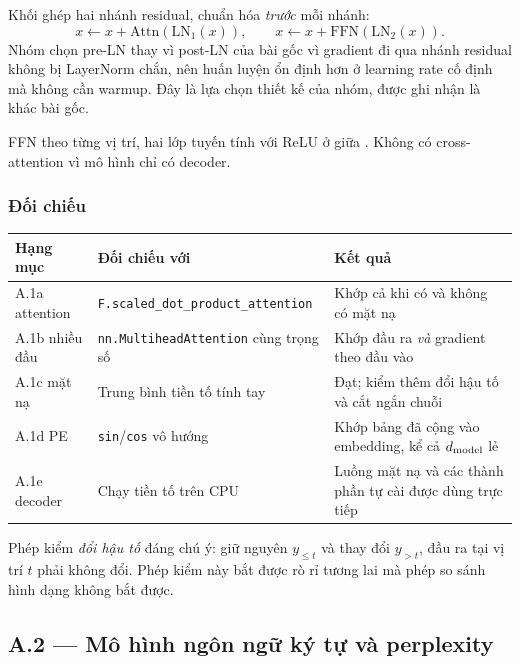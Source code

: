 Khối ghép hai nhánh residual, chuẩn hóa \emph{trước} mỗi nhánh:
\[
  x \leftarrow x + \mathrm{Attn}(\mathrm{LN}_1(x)),\qquad
  x \leftarrow x + \mathrm{FFN}(\mathrm{LN}_2(x)).
\]
Nhóm chọn pre-LN thay vì post-LN của bài gốc vì gradient đi qua nhánh residual
không bị LayerNorm chắn, nên huấn luyện ổn định hơn ở learning rate cố định mà
không cần warmup. Đây là lựa chọn thiết kế của nhóm, được ghi nhận là khác bài gốc.

FFN theo từng vị trí, hai lớp tuyến tính với ReLU ở giữa
\cite[§3.3]{attention}. Không có cross-attention vì mô hình chỉ có decoder.

\subsubsection{Đối chiếu \dalam}

\begin{center}
\begin{tabular}{p{}p{}p{}}
\toprule
\textbf{Hạng mục} & \textbf{Đối chiếu với} & \textbf{Kết quả}\\
\midrule
A.1a attention & \texttt{F.scaled\_dot\_product\_}\allowbreak\texttt{attention} &
Khớp cả khi có và không có mặt nạ\\
A.1b nhiều đầu & \texttt{nn.MultiheadAttention} cùng trọng số &
Khớp đầu ra \emph{và} gradient theo đầu vào\\
A.1c mặt nạ & Trung bình tiền tố tính tay &
Đạt; kiểm thêm đổi hậu tố và cắt ngắn chuỗi\\
A.1d PE & \texttt{sin}/\texttt{cos} vô hướng &
Khớp bảng đã cộng vào embedding, kể cả $d_{\mathrm{model}}$ lẻ\\
A.1e decoder & Chạy tiền tố trên CPU &
Luồng mặt nạ và các thành phần tự cài được dùng trực tiếp\\
\bottomrule
\end{tabular}
\end{center}

Phép kiểm \emph{đổi hậu tố} đáng chú ý: giữ nguyên $y_{\le t}$ và thay đổi
$y_{>t}$, đầu ra tại vị trí $t$ phải không đổi. Phép kiểm này bắt được rò rỉ tương
lai mà phép so sánh hình dạng không bắt được.

\subsection{A.2 --- Mô hình ngôn ngữ ký tự và perplexity}
\label{sec:a2}

